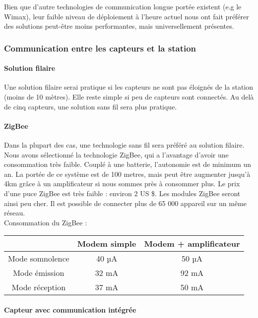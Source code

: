 Bien que d’autre technologies de communication longue portée existent (e.g le Wimax), leur faible niveau de déploiement à l’heure actuel nous ont fait préférer des solutions peut-être moins performantes, mais universellement présentes.

\subsubsection{Communication entre les capteurs et la station}

\paragraph{Solution filaire}
Une solution filaire serai pratique si les capteurs ne sont pas éloignés de la station (moins de 10 mètres). Elle reste simple si peu de capteurs sont connectés.
Au delà de cinq capteurs, une solution sans fil sera plus pratique.\\

\paragraph{ZigBee}

Dans la plupart des cas, une technologie sans fil sera préféré au solution filaire. Nous avons sélectionné la technologie ZigBee, qui a l’avantage d’avoir une consommation très faible. Couplé à une batterie, l’autonomie est de minimum un an. 
La portée de ce système est de 100 metres, mais peut être augmenter jusqu’à 4km grâce à un amplificateur si nous sommes près à consommer plus. Le prix d’une puce ZigBee est très faible : environ 2 US \$. Les modules ZigBee seront ainsi peu cher.
Il est possible de connecter plus de 65 000 appareil sur un même réseau.\\

Consommation du ZigBee :

\begin{center}
\begin{tabular}{|c|c|c|}
\hline  & Modem simple & Modem + amplificateur \\ 
\hline Mode somnolence & 40 µA & 50 µA \\ 
\hline Mode émission & 32 mA  & 92 mA \\ 
\hline Mode réception & 37 mA  & 50 mA \\ 
\hline 
\end{tabular} 
\end{center}

\paragraph{Capteur avec communication intégrée}

